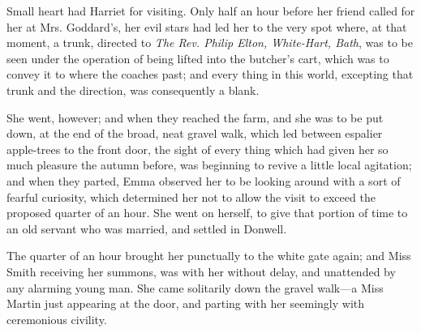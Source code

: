 Small heart had Harriet for visiting. Only half an hour before her friend called for her at Mrs. Goddard's, her evil stars had led her to the very spot where, at that moment, a trunk, directed to {\em The Rev. Philip Elton, White-Hart, Bath}, was to be seen under the operation of being lifted into the butcher's cart, which was to convey it to where the coaches past; and every thing in this world, excepting that trunk and the direction, was consequently a blank.

She went, however; and when they reached the farm, and she was to be put down, at the end of the broad, neat gravel walk, which led between espalier apple-trees to the front door, the sight of every thing which had given her so much pleasure the autumn before, was beginning to revive a little local agitation; and when they parted, Emma observed her to be looking around with a sort of fearful curiosity, which determined her not to allow the visit to exceed the proposed quarter of an hour. She went on herself, to give that portion of time to an old servant who was married, and settled in Donwell.

The quarter of an hour brought her punctually to the white gate again; and Miss Smith receiving her summons, was with her without delay, and unattended by any alarming young man. She came solitarily down the gravel walk---a Miss Martin just appearing at the door, and parting with her seemingly with ceremonious civility.

